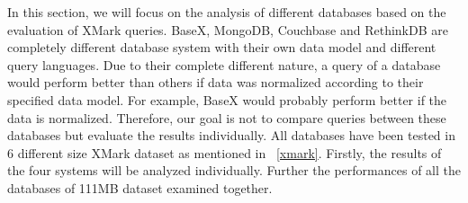In this section, we will focus on the analysis of different databases based on the  evaluation of XMark queries. BaseX, MongoDB, Couchbase and RethinkDB are completely different database system  with their own data model and different query languages.  Due to their complete different nature, a query of a database would perform better than others if data was normalized according to their specified data model. For example, BaseX would probably perform better if the data is normalized. Therefore, our goal is not to compare queries between these databases but evaluate the results individually.  All databases have been tested in 6 different size XMark dataset as mentioned in ~\ref{xmark}. Firstly, the results  of the four systems will be analyzed individually. Further the performances of all the databases of 111MB dataset examined together.

